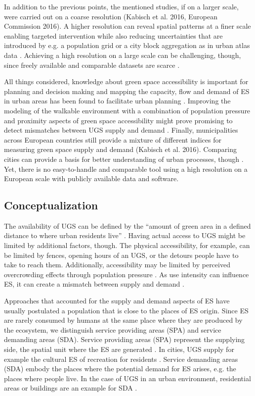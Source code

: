 \documentclass[10pt]{article}
\begin{document}
In addition to the previous points, the mentioned studies, if on a larger scale, were carried out on a coarse resolution (Kabisch et al. 2016, European Commission 2016).
A higher resolution can reveal spatial patterns at a finer scale enabling targeted intervention while also reducing uncertainties that are introduced by e.g. a population grid or a city block aggregation as in urban atlas data \citep{Barthelemy.2018, Esch.2014}.
Achieving a high resolution on a large scale can be challenging, though, since freely available and comparable datasets are scarce \citep{Feltynowski.2018, Dworczyk.2021}.

All things considered, knowledge about green space accessibility is important for planning and decision making and mapping the capacity, flow and demand of ES in urban areas has been found to facilitate urban planning \citep{Baro.2016}.
Improving the modeling of the walkable environment with a combination of population pressure and proximity aspects of green space accessibility might prove promising to detect mismatches between UGS supply and demand \citep{Biernacka.2019, Biernacka.2020}.
Finally, municipalities across European countries still provide a mixture of different indices for measuring green space supply and demand (Kabisch et al. 2016).
Comparing cities can provide a basis for better understanding of urban processes, though \citep{Wolff.2020}.
Yet, there is no easy-to-handle and comparable tool using a high resolution on a European scale with publicly available data and software.


\subsection{Conceptualization}
The availability of UGS can be defined by the “amount of green area in a defined distance to where urban residents live” \citep{Kabisch.2016}.
Having actual access to UGS might be limited by additional factors, though. 
The physical accessibility, for example, can be limited by fences, opening hours of an UGS, or the detours people have to take to reach them. 
Additionally, accessibility may be limited by perceived overcrowding effects through population pressure \citep{Kabisch.2016, Wolff.2020b}.
As use intensity can influence ES, it can create a mismatch between supply and demand \citep{Syrbe.2017}. 

Approaches that accounted for the supply and demand aspects of ES have usually postulated a population that is close to the places of ES origin. 
Since ES are rarely consumed by humans at the same place where they are produced by the ecosystem, we distinguish service providing areas (SPA) and service demanding areas (SDA). 
Service providing areas (SPA) represent the supplying side, the spatial unit where the ES are generated \citep{Syrbe.2012, Dworczyk.2021}.
In cities, UGS supply for example the cultural ES of recreation for residents \citep{Dickinson.2017}.
Service demanding areas (SDA) embody the places where the potential demand for ES arises, e.g. the places where people live. In the case of UGS in an urban environment, residential areas or buildings are an example for SDA \citep{Dworczyk.2021}.
\end{document}
